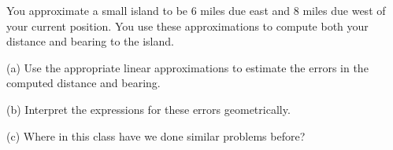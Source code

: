 \documentclass{ximera}
\begin{document}
\begin{question}  \label{QE4gb4ttb}
You approximate a small island to be $6$ miles due east and $8$ miles due west of your current position. You use these approximations to compute both your distance and bearing to the island. 

(a) Use the appropriate linear approximations to estimate the errors in the computed distance and bearing.

(b) Interpret the expressions for these errors geometrically.

(c) Where in this class have we done similar problems before?

\end{question}
\end{document}
